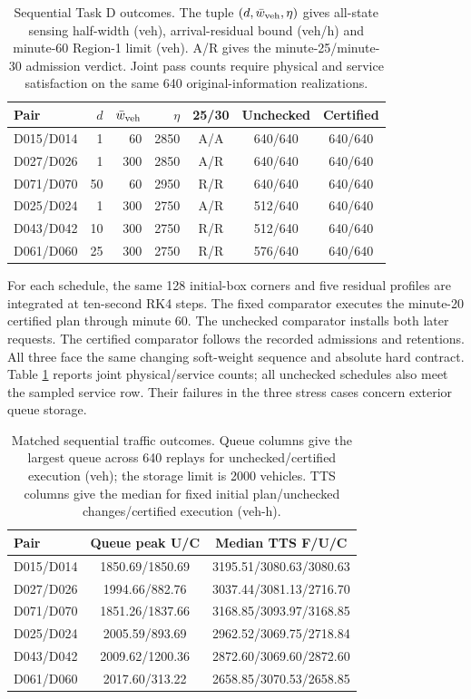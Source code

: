 \documentclass[preprint,12pt]{elsarticle}
\numberwithin{equation}{section}
\begin{document}
\begin{table}[t]
\centering\small
\caption{Sequential Task D outcomes. The tuple $(d,\bar w_{\rm veh},\eta)$ gives
all-state sensing half-width (veh), arrival-residual bound (veh/h) and
minute-60 Region-1 limit (veh). A/R gives the minute-25/minute-30
admission verdict. Joint pass counts require physical and service
satisfaction on the same 640 original-information realizations.}
\label{tab:supp-sequential-coverage}
\setlength{\tabcolsep}{4pt}
\begin{tabular}{@{}lrrrccc@{}}
\toprule
Pair & $d$ & $\bar w_{\rm veh}$ & $\eta$ & 25/30 & Unchecked & Certified\\
\midrule
D015/D014 & 1 & 60 & 2850 & A/A & 640/640 & 640/640\\
D027/D026 & 1 & 300 & 2850 & A/R & 640/640 & 640/640\\
D071/D070 & 50 & 60 & 2950 & R/R & 640/640 & 640/640\\
D025/D024 & 1 & 300 & 2750 & A/R & 512/640 & 640/640\\
D043/D042 & 10 & 300 & 2750 & R/R & 512/640 & 640/640\\
D061/D060 & 25 & 300 & 2750 & R/R & 576/640 & 640/640\\
\bottomrule
\end{tabular}
\end{table}

For each schedule, the same 128 initial-box corners and five residual
profiles are integrated at ten-second RK4 steps. The fixed comparator
executes the minute-20 certified plan through minute 60. The unchecked
comparator installs both later requests. The certified comparator follows
the recorded admissions and retentions. All three face the same changing
soft-weight sequence and absolute hard contract. Table
\ref{tab:supp-sequential-coverage} reports joint physical/service counts;
all unchecked schedules also meet the sampled service row. Their failures
in the three stress cases concern exterior queue storage.

\begin{table}[t]
\centering\small
\caption{Matched sequential traffic outcomes. Queue columns give the
largest queue across 640 replays for unchecked/certified execution (veh);
the storage limit is 2000 vehicles. TTS columns give the median for fixed
initial plan/unchecked changes/certified execution (veh-h).}
\label{tab:supp-sequential-traffic}
\setlength{\tabcolsep}{5pt}
\begin{tabular}{@{}lcc@{}}
\toprule
Pair & Queue peak U/C & Median TTS F/U/C\\
\midrule
D015/D014 & 1850.69/1850.69 & 3195.51/3080.63/3080.63\\
D027/D026 & 1994.66/882.76 & 3037.44/3081.13/2716.70\\
D071/D070 & 1851.26/1837.66 & 3168.85/3093.97/3168.85\\
D025/D024 & 2005.59/893.69 & 2962.52/3069.75/2718.84\\
D043/D042 & 2009.62/1200.36 & 2872.60/3069.60/2872.60\\
D061/D060 & 2017.60/313.22 & 2658.85/3070.53/2658.85\\
\bottomrule
\end{tabular}
\end{table}
\end{document}
